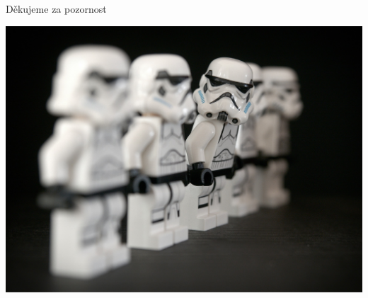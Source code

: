 \documentclass{beamer}
\begin{document}
\begin{frame}
\begin{center}
\begin{huge}
Děkujeme za pozornost
\end{huge}
  \centering
  \includegraphics[width=.8\linewidth]{stormtroop.jpg}
\end{center}

\end{frame}
\end{document}
